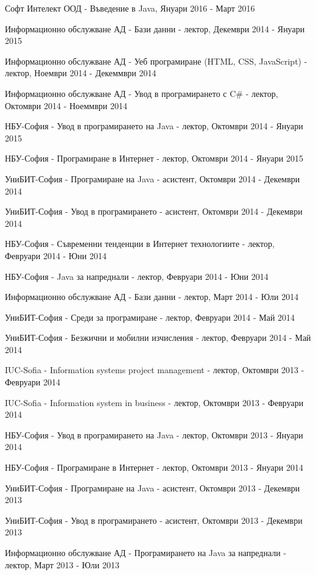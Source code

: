 \documentclass[bulgarian,a4paper]{europasscv}
\begin{document}
\begin{europasscv}
{\begin{ecvitemize}
    \item Софт Интелект ООД  - Въведение в Java, Януари 2016 - Март 2016
    \item Информационно обслужване АД - Бази данни - лектор, Декември 2014 - Януари 2015
    \item Информационно обслужване АД - Уеб програмиране (HTML, CSS, JavaScript) - лектор, Ноември 2014 - Декеммври 2014
    \item Информационно обслужване АД - Увод в програмирането с C\# - лектор, Октомври 2014 - Ноеммври 2014
    \item НБУ-София - Увод в програмирането на Java - лектор, Октомври 2014 - Януари 2015
    \item НБУ-София - Програмиране в Интернет - лектор, Октомври 2014 - Януари 2015
    \item УниБИТ-София - Програмиране на Java - асистент, Октомври 2014 - Декември 2014
    \item УниБИТ-София - Увод в програмирането - асистент, Октомври 2014 - Декември 2014
    \item НБУ-София - Съвременни тенденции в Интернет технологиите - лектор, Февруари 2014 - Юни 2014
    \item НБУ-София - Java за напреднали - лектор, Февруари 2014 - Юни 2014
    \item Информационно обслужване АД - Бази данни - лектор, Март 2014 - Юли 2014
    \item УниБИТ-София - Среди за програмиране - лектор, Февруари 2014 - Май 2014
    \item УниБИТ-София - Безжични и мобилни изчисления - лектор, Февруари 2014 - Май 2014
    \item IUC-Sofia - Information systems project management - лектор, Октомври 2013 - Февруари 2014
    \item IUC-Sofia - Information system in business - лектор, Октомври 2013 - Февруари 2014
    \item НБУ-София - Увод в програмирането на Java - лектор, Октомври 2013 - Януари 2014
    \item НБУ-София - Програмиране в Интернет - лектор, Октомври 2013 - Януари 2014
    \item УниБИТ-София - Програмиране на Java - асистент, Октомври 2013 - Декември 2013
    \item УниБИТ-София - Увод в програмирането - асистент, Октомври 2013 - Декември 2013
    \item Информационно обслужване АД - Програмирането на Java за напреднали - лектор, Март 2013 - Юли 2013

\end{ecvitemize}}
\end{europasscv}
\end{document}
